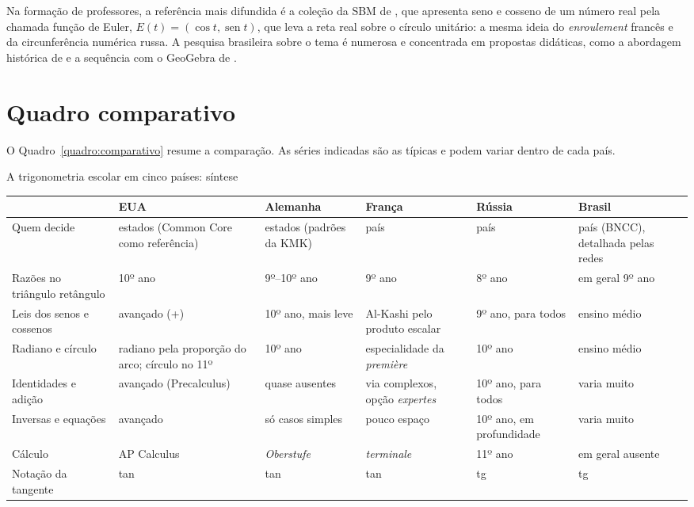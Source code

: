 \documentclass[
    article,
    12pt,
    a4paper,
    sumario=tradicional
]{abntex2}
\begin{document}
Na formação de professores, a referência mais difundida é a coleção da SBM de
, que apresenta seno e cosseno de um número real pela
chamada função de Euler, $E(t) = (\cos t, \operatorname{sen} t)$, que leva a
reta real sobre o círculo unitário: a mesma ideia do \textit{enroulement}
francês e da circunferência numérica russa. A pesquisa brasileira sobre o tema
é numerosa e concentrada em propostas didáticas, como a abordagem histórica de
 e a sequência com o GeoGebra de .

\section{Quadro comparativo}

O Quadro~\ref{quadro:comparativo} resume a comparação. As séries indicadas são
as típicas e podem variar dentro de cada país.

\begin{quadro}[htb]
\footnotesize
\caption{A trigonometria escolar em cinco países: síntese}
\label{quadro:comparativo}
\begin{tabularx}{\textwidth}{@{}>{\raggedright\arraybackslash}p{2.4cm}YYYYY@{}}
\toprule
 & \textbf{EUA} & \textbf{Alemanha} & \textbf{França} & \textbf{Rússia} & \textbf{Brasil}\\
\midrule
Quem decide & estados (Common Core como referência) & estados (padrões da KMK) & país & país & país (BNCC), detalhada pelas redes\\
Razões no triângulo retângulo & 10º ano & 9º--10º ano & 9º ano & 8º ano & em geral 9º ano\\
Leis dos senos e cossenos & avançado (+) & 10º ano, mais leve & Al-Kashi pelo produto escalar & 9º ano, para todos & ensino médio\\
Radiano e círculo & radiano pela proporção do arco; círculo no 11º & 10º ano & especialidade da \textit{première} & 10º ano & ensino médio\\
Identidades e adição & avançado (Precalculus) & quase ausentes & via complexos, opção \textit{expertes} & 10º ano, para todos & varia muito\\
Inversas e equações & avançado & só casos simples & pouco espaço & 10º ano, em profundidade & varia muito\\
Cálculo & AP Calculus & \textit{Oberstufe} & \textit{terminale} & 11º ano & em geral ausente\\
Notação da tangente & tan & tan & tan & tg & tg\\
\bottomrule
\end{tabularx}
\end{quadro}
\end{document}
